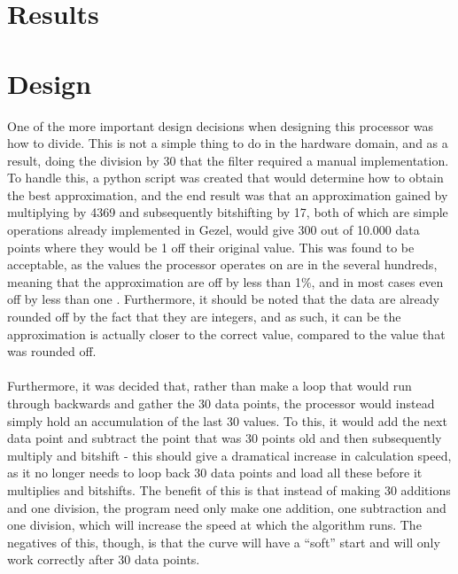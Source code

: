 \documentclass[12pt,a4paper]{article}
\begin{document}
\section{Results}
	

\section{Design}
One of the more important design decisions when designing this processor was how to divide. This is not a simple thing to do in the hardware domain, and as a result, doing the division by 30 that the filter required a manual implementation. To handle this, a python script was created that would determine how to obtain the best approximation, and the end result was that an approximation gained by multiplying by 4369 and subsequently bitshifting by 17, both of which are simple operations already implemented in Gezel, would give 300 out of 10.000 data points where they would be 1 off their original value. This was found to be acceptable, as the values the processor operates on are in the several hundreds, meaning that the approximation are off by less than 1\%, and in most cases even off by less than one \textperthousand. Furthermore, it should be noted that the data are already rounded off by the fact that they are integers, and as such, it can be the approximation is actually closer to the correct value, compared to the value that was rounded off.\\
\\
Furthermore, it was decided that, rather than make a loop that would run through backwards and gather the 30 data points, the processor would instead simply hold an accumulation of the last 30 values. To this, it would add the next data point and subtract the point that was 30 points old and then subsequently multiply and bitshift - this should give a dramatical increase in calculation speed, as it no longer needs to loop back 30 data points and load all these before it multiplies and bitshifts. The benefit of this is that instead of making 30 additions and one division, the program need only make one addition, one subtraction and one division, which will increase the speed at which the algorithm runs. The negatives of this, though, is that the curve will have a ``soft'' start and will only work correctly after 30 data points.\\
\end{document}
